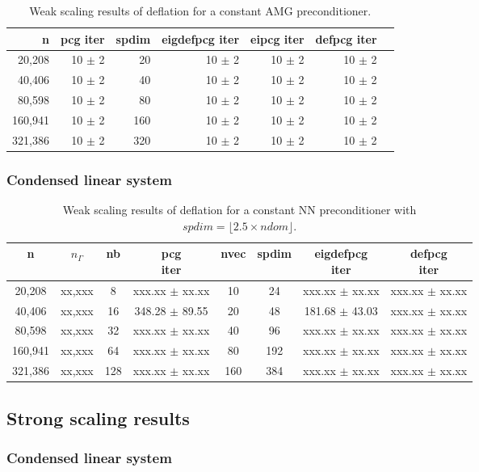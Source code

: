 \documentclass{article}
\begin{document}
\begin{table}[ht]
	\caption{Weak scaling results of deflation for a constant AMG preconditioner.}
	\centering
	\begin{tabular}{|r|r|r|r|r|r|r|}
		\hline
		n & pcg iter & spdim & eigdefpcg iter & eipcg iter & defpcg iter\\
		\hline
		20,208  &  10 $\pm$ 2 & 20 & 10 $\pm$ 2 & 10 $\pm$ 2 & 10 $\pm$ 2 \\
		40,406  & 10 $\pm$ 2 & 40 & 10 $\pm$ 2 & 10 $\pm$ 2 & 10 $\pm$ 2 \\
		80,598  & 10 $\pm$ 2 & 80 & 10 $\pm$ 2 & 10 $\pm$ 2 & 10 $\pm$ 2 \\
		160,941 & 10 $\pm$ 2 & 160 & 10 $\pm$ 2 & 10 $\pm$ 2 & 10 $\pm$ 2 \\
		321,386 & 10 $\pm$ 2 & 320 & 10 $\pm$ 2 & 10 $\pm$ 2 & 10 $\pm$ 2 \\
		\hline
	\end{tabular}
	\label{Tab:020}
\end{table}

\subsubsection{Condensed linear system}

\begin{table}[ht]
	\caption{Weak scaling results of deflation for a constant NN preconditioner with $spdim=\lfloor 2.5 \times ndom\rfloor$.}
	\centering
	\begin{tabular}{|c|c|c|c|c|c|c|c|}
	\hline
	n & $n_\Gamma$ & nb & \makecell{pcg\\ iter} & nvec & spdim & \makecell{eigdefpcg\\ iter} & \makecell{defpcg\\ iter}\\
	\hline
	20,208  &  xx,xxx &   8 & xxx.xx $\pm$ xx.xx &  10 &  24 & xxx.xx $\pm$ xx.xx & xxx.xx $\pm$ xx.xx \\
	40,406  &  xx,xxx &  16 & 348.28 $\pm$ 89.55 &  20 &  48 & 181.68 $\pm$ 43.03 & xxx.xx $\pm$ xx.xx \\
	80,598  &  xx,xxx &  32 & xxx.xx $\pm$ xx.xx &  40 &  96 & xxx.xx $\pm$ xx.xx & xxx.xx $\pm$ xx.xx \\
	160,941 &  xx,xxx &  64 & xxx.xx $\pm$ xx.xx &  80 & 192 & xxx.xx $\pm$ xx.xx & xxx.xx $\pm$ xx.xx \\
	321,386 &  xx,xxx & 128 & xxx.xx $\pm$ xx.xx & 160 & 384 & xxx.xx $\pm$ xx.xx & xxx.xx $\pm$ xx.xx \\
	\hline
\end{tabular}
	\label{Tab:025}
\end{table}

\subsection{Strong scaling results}



\subsubsection{Condensed linear system}
\end{document}
